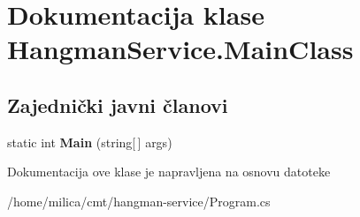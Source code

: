 \hypertarget{classHangmanService_1_1MainClass}{}\section{Dokumentacija klase Hangman\+Service.\+Main\+Class}
\label{classHangmanService_1_1MainClass}
\subsection*{Zajednički javni članovi}
\begin{DoxyCompactItemize}
\item 
\hypertarget{classHangmanService_1_1MainClass_a346a166a01ba1c3ea5df5565ee2cef6a}{}static int {\bfseries Main} (string\mbox{[}$\,$\mbox{]} args)\label{classHangmanService_1_1MainClass_a346a166a01ba1c3ea5df5565ee2cef6a}

\end{DoxyCompactItemize}


Dokumentacija ove klase je napravljena na osnovu datoteke \begin{DoxyCompactItemize}
\item 
/home/milica/cmt/hangman-\/service/Program.\+cs\end{DoxyCompactItemize}
